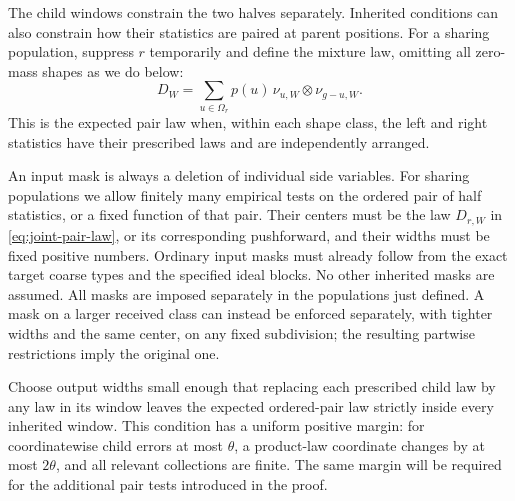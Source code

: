 The child windows constrain the two halves separately.  Inherited
conditions can also constrain how their statistics are paired at parent
positions.  For a sharing population, suppress $r$ temporarily and define
the mixture law, omitting all zero-mass shapes as we do below:
\begin{equation}\label{eq:joint-pair-law}
 D_W=\sum_{u\in\Omega_r}p(u)\,
       \nu_{u,W}\otimes\nu_{g-u,W}.
\end{equation}
This is the expected pair law when, within each shape class, the left
and right statistics have their prescribed laws and are independently
arranged.

An input mask is always a deletion of individual side variables.
For sharing populations we allow finitely many empirical tests on
the ordered pair of half statistics, or a fixed function of that pair.
Their centers must be the law $D_{r,W}$ in
\eqref{eq:joint-pair-law}, or its corresponding pushforward, and their
widths must be fixed positive numbers.  Ordinary input masks must
already follow from the exact target coarse types and the specified
ideal blocks.  No other inherited masks are assumed.  All masks are
imposed separately in the populations just defined.  A mask on a
larger received class can instead be enforced separately, with
tighter widths and the same center, on any fixed subdivision; the
resulting partwise restrictions imply the original one.

Choose output widths small enough that replacing each prescribed
child law by any law in its window leaves the expected ordered-pair
law strictly inside every inherited window.  This condition has a
uniform positive margin: for coordinatewise child errors at most
$\theta$, a product-law coordinate changes by at most $2\theta$,
and all relevant collections are finite.  The same margin will be
required for the additional pair tests introduced in the proof.

